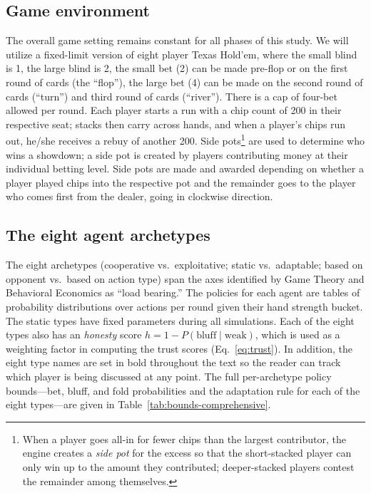 \documentclass[10pt,twocolumn,letterpaper]{article}
\begin{document}
\subsection{Game environment}
The overall game setting remains constant for all phases of this
study. We will utilize a fixed-limit version of eight player Texas
Hold'em, where the small blind is 1, the large blind is 2, the small
bet (2) can be made pre-flop or on the first round of cards (the
``flop''), the large bet (4) can be made on the
second round of cards (``turn'') and third round of cards
(``river''). There is a cap of four-bet allowed per round. Each player starts a run with a chip count of 200 in their
respective seat; stacks then carry across hands, and when a player's
chips run out, he/she receives a rebuy of another 200. Side
pots\footnote{When a player goes all-in for fewer chips than the
largest contributor, the engine creates a \textit{side pot} for the
excess so that the short-stacked player can only win up to the
amount they contributed; deeper-stacked players contest the
remainder among themselves.} are used to determine who wins a
showdown; a side pot is created by
players contributing money at their individual betting level. Side
pots are made and awarded depending on whether a player played chips
into the respective pot and the remainder goes to the player who
comes first from the dealer, going in clockwise direction.

\subsection{The eight agent archetypes}\label{sec:archetypes}
The eight archetypes (cooperative vs.\ exploitative; static vs.\
adaptable; based on opponent vs.\ based on action type) span the
axes identified by Game Theory and Behavioral Economics as ``load
bearing.'' The policies for each agent are tables of probability
distributions over actions per round given their hand strength
bucket. The static types have fixed parameters during all
simulations. Each of the eight types also has an \textit{honesty}
score $h = 1 - P(\text{bluff}\mid\text{weak})$,
which is used as a weighting factor in computing the trust scores
(Eq.~\ref{eq:trust}). In addition, the eight type names are set in
bold throughout the text so the reader can track which player is
being discussed at any point. The full per-archetype policy
bounds---bet, bluff, and fold
probabilities and the adaptation rule for each of the eight
types---are given in Table~\ref{tab:bounds-comprehensive}.
\end{document}
